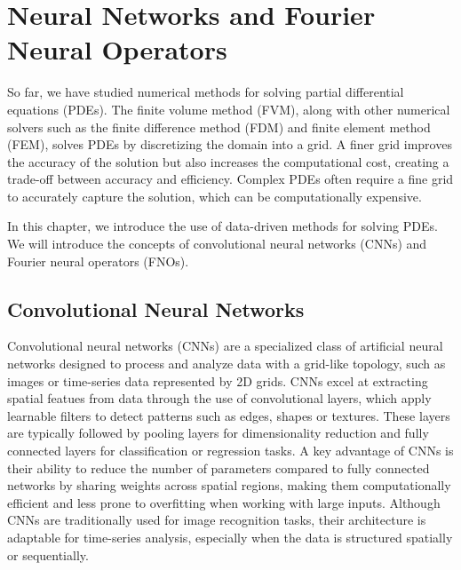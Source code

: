 \chapter{Neural Networks and Fourier Neural Operators}\label{ch:FNO+NN}
So far, we have studied numerical methods for solving partial differential equations (PDEs).
The finite volume method (FVM), along with other numerical solvers such as the finite difference method (FDM) and finite element method (FEM), solves PDEs by discretizing the domain into a grid.
A finer grid improves the accuracy of the solution but also increases the computational cost, creating a trade-off between accuracy and efficiency.
Complex PDEs often require a fine grid to accurately capture the solution, which can be computationally expensive.

In this chapter, we introduce the use of data-driven methods for solving PDEs.
We will introduce the concepts of convolutional neural networks (CNNs) and Fourier neural operators (FNOs).

\section{Convolutional Neural Networks}
Convolutional neural networks (CNNs) are a specialized class of artificial neural networks designed to process and analyze data with a grid-like topology, such as images or time-series data represented by 2D grids.
CNNs excel at extracting spatial featues from data through the use of convolutional layers, which apply learnable filters to detect patterns such as edges, shapes or textures.
These layers are typically followed by pooling layers for dimensionality reduction and fully connected layers for classification or regression tasks.
A key advantage of CNNs is their ability to reduce the number of parameters compared to fully connected networks by sharing weights across spatial regions, making them computationally efficient and less prone to overfitting when working with large inputs.
Although CNNs are traditionally used for image recognition tasks, their architecture is adaptable for time-series analysis, especially when the data is structured spatially or sequentially.

